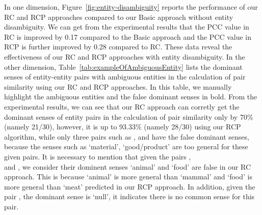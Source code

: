 In one dimension, Figure~\ref{fig:entity-disambiguity} reports the performance of our RC and RCP approaches compared to our Basic approach without entity disambiguity. We can get from the experimental results that the PCC value in RC is improved by 0.17 compared to the Basic approach and the PCC value in RCP is further improved by 0.28 compared to RC. These data reveal the effectiveness of our RC and RCP approaches with entity disambiguity. In the other dimension, Table~\ref{tab:exampleOfAmbiguousEntity} lists the dominant senses of entity-entity pairs with ambiguous entities in the calculation of pair similarity using our RC and RCP approaches. In this table, we manually highlight the ambiguous entities and the false dominant senses in bold.
From the experimental results, we can see that our RC approach can corretly get the dominant senses of entity pairs in the calculation of pair similarity only by 70\% (namely 21/30), however, it is up to 93.33\% (namely 28/30) using our RCP algorithm, while only three pairs such as ,  and  have the false dominant senses, because the senses such as `material', `good/product' are too general for these given pairs. It is necessary to mention that given the pairs ,  \\and {}, we consider their dominent senses `animal' and `food' are false in our RC approach. This is because `animal' is more general than `mammal' and `food' is more general than `meat' predicted in our RCP approach. In addition, given the pair , the dominant sense is `null', it indicates there is no common sense for this pair.

